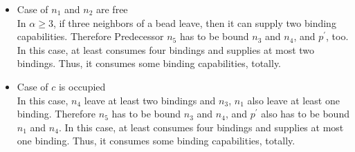 \documentclass[runningheads]{llncs}
\begin{document}
\begin{itemize}
\item{Case of $n_1$ and $n_2$ are free}\\
  In $\alpha \geq 3$, if three neighbors of a bead leave, then it can supply two binding capabilities. Therefore Predecessor $n_5$ has to be bound $n_3$ and $n_4$, and $p^\prime$, too. In this case, at least consumes four bindings and supplies at most two bindings. Thus, it consumes some binding capabilities, totally.
  
\item{Case of $c$ is occupied}\\
  In this case, $n_4$ leave at least two bindings and $n_3$, $n_1$ also leave at least one binding. Therefore $n_5$ has to be bound $n_3$ and $n_4$, and $p^\prime$ also has to be bound $n_1$ and $n_4$. In this case, at least consumes four bindings and supplies at most one binding. Thus, it consumes some binding capabilities, totally.
\end{itemize}
\end{document}
